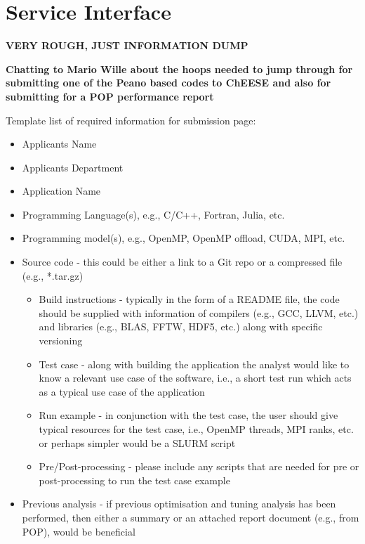 \section{Service Interface}
\label{chapter:service-interface}
\textbf{VERY ROUGH, JUST INFORMATION DUMP}

\noindent \textbf{Chatting to Mario Wille about the hoops needed to jump through for submitting one of the Peano based codes to ChEESE and also for submitting for a POP performance report}


Template list of required information for submission page:
\begin{itemize}
  \item Applicants Name
  \item Applicants Department
  \item Application Name
  \item Programming Language(s), e.g., C/C++, Fortran, Julia, etc.
  \item Programming model(s), e.g., OpenMP, OpenMP offload, CUDA, MPI, etc.
  \item Source code - this could be either a link to a Git repo or a compressed file (e.g., *.tar.gz)
  \begin{itemize}
    \item Build instructions - typically in the form of a README file, the code should be supplied with information of compilers (e.g., GCC, LLVM, etc.) and libraries (e.g., BLAS, FFTW, HDF5, etc.) along with specific versioning
    \item Test case - along with building the application the analyst would like to know a relevant use case of the software, i.e., a short test run which acts as a typical use case of the application
    \item Run example - in conjunction with the test case, the user should give typical resources for the test case, i.e., OpenMP threads, MPI ranks, etc. or perhaps simpler would be a SLURM script
    \item Pre/Post-processing - please include any scripts that are needed for pre or post-processing to run the test case example
  \end{itemize}
  \item Previous analysis - if previous optimisation and tuning analysis has been performed, then either a summary or an attached report document (e.g., from POP), would be beneficial
\end{itemize}

